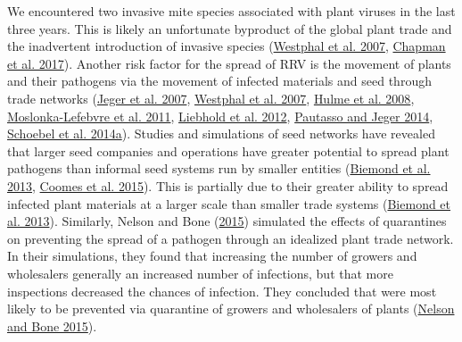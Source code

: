 \documentclass{ufdissertation}[overrideChapters] %
\begin{document}
{We encountered two invasive mite species associated with plant viruses in the last three years. This is likely an unfortunate byproduct of the global plant trade and the inadvertent introduction of invasive species (\protect\hyperlink{ref-Westphal2007}{Westphal et al. 2007}, \protect\hyperlink{ref-Chapman2017}{Chapman et al. 2017}). Another risk factor for the spread of RRV is the movement of plants and their pathogens via the movement of infected materials and seed through trade networks (\protect\hyperlink{ref-Jeger2007}{Jeger et al. 2007}, \protect\hyperlink{ref-Westphal2007}{Westphal et al. 2007}, \protect\hyperlink{ref-Hulme2008}{Hulme et al. 2008}, \protect\hyperlink{ref-MoslonkaLefebvre2011}{Moslonka-Lefebvre et al. 2011}, \protect\hyperlink{ref-Liebhold2012}{Liebhold et al. 2012}, \protect\hyperlink{ref-Pautasso2014}{Pautasso and Jeger 2014}, \protect\hyperlink{ref-Schoebel2014}{Schoebel et al. 2014a}). Studies and simulations of seed networks have revealed that larger seed companies and operations have greater potential to spread plant pathogens than informal seed systems run by smaller entities (\protect\hyperlink{ref-Biemond2013}{Biemond et al. 2013}, \protect\hyperlink{ref-Coomes2015}{Coomes et al. 2015}). This is partially due to their greater ability to spread infected plant materials at a larger scale than smaller trade systems (\protect\hyperlink{ref-Biemond2013}{Biemond et al. 2013}). Similarly, Nelson and Bone (\protect\hyperlink{ref-Nelson2015}{2015}) simulated the effects of quarantines on preventing the spread of a pathogen through an idealized plant trade network. In their simulations, they found that increasing the number of growers and wholesalers generally an increased number of infections, but that more inspections decreased the chances of infection. They concluded that were most likely to be prevented via quarantine of growers and wholesalers of plants (\protect\hyperlink{ref-Nelson2015}{Nelson and Bone 2015}).

\docBodyfalse

\raggedright\doublespacing

\setcounter{secnumdepth}{-1}

\setcounter{secnumdepth}{4}

}
\end{document}
